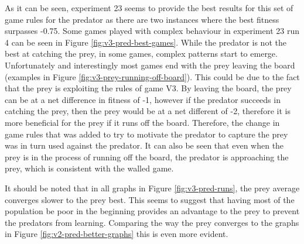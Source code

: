 As it can be seen, experiment 23 seems to provide the best results for this set of game rules for the predator as there are two instances where the best fitness surpasses -0.75. Some games played with complex behaviour in experiment 23 run 4 can be seen in Figure \ref{fig:v3-pred-best-games}. While the predator is not the best at catching the prey, in some games, complex patterns start to emerge. Unfortunately and interestingly most games end with the prey leaving the board (examples in Figure \ref{fig:v3-prey-running-off-board}). This could be due to the fact that the prey is exploiting the rules of game V3. By leaving the board, the prey can be at a net difference in fitness of -1, however if the predator succeeds in catching the prey, then the prey would be at a net different of -2, therefore it is more beneficial for the prey if it runs off the board. Therefore, the change in game rules that was added to try to motivate the predator to capture the prey was in turn used against the predator. It can also be seen that even when the prey is in the process of running off the board, the predator is approaching the prey, which is consistent with the walled game.



It should be noted that in all graphs in Figure \ref{fig:v3-pred-runs}, the prey average converges slower to the prey best. This seems to suggest that having most of the population be poor in the beginning provides an advantage to the prey to prevent the predators from learning. Comparing the way the prey converges to the graphs in Figure \ref{fig:v2-pred-better-graphs} this is even more evident.



